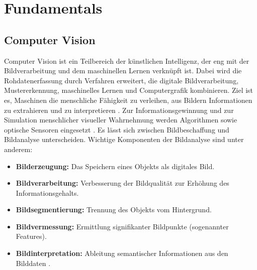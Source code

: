 \chapter{Fundamentals}
\label{ch:fundamentals}

\section{Computer Vision}
Computer Vision ist ein Teilbereich der künstlichen Intelligenz, der eng mit der Bildverarbeitung und dem maschinellen Lernen verknüpft ist. Dabei wird die Rohdatenerfassung durch Verfahren erweitert, die digitale Bildverarbeitung, Mustererkennung, maschinelles Lernen und Computergrafik kombinieren. Ziel ist es, Maschinen die menschliche Fähigkeit zu verleihen, aus Bildern Informationen zu extrahieren und zu interpretieren \citep{Wiley2018}. Zur Informationsgewinnung und zur Simulation menschlicher visueller Wahrnehmung werden Algorithmen sowie optische Sensoren eingesetzt \citep{Matiacevich2013}. Es lässt sich zwischen Bildbeschaffung und Bildanalyse unterscheiden. Wichtige Komponenten der Bildanalyse sind unter anderem:
\begin{itemize}
    \item \textbf{Bilderzeugung:} Das Speichern eines Objekts als digitales Bild.
    \item \textbf{Bildverarbeitung:} Verbesserung der Bildqualität zur Erhöhung des Informationsgehalts.
    \item \textbf{Bildsegmentierung:} Trennung des Objekts vom Hintergrund.
    \item \textbf{Bildvermessung:} Ermittlung signifikanter Bildpunkte (sogenannter Features).
    \item \textbf{Bildinterpretation:} Ableitung semantischer Informationen aus den Bilddaten \citep{Mery2013}. 
\end{itemize}







